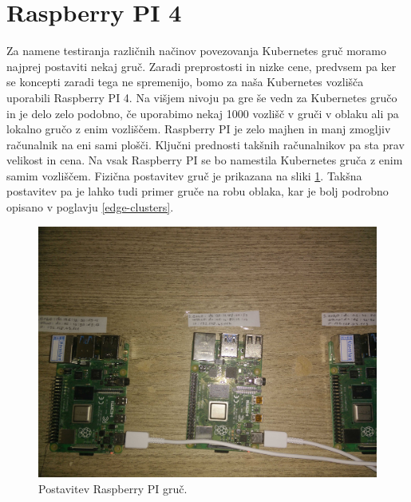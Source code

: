 \documentclass[a4paper, 12pt]{book}
\begin{document}
\section{Raspberry PI 4}
Za namene testiranja različnih načinov povezovanja Kubernetes gruč moramo najprej postaviti nekaj gruč.
Zaradi preprostosti in nizke cene, predvsem pa ker se koncepti zaradi tega ne spremenijo, bomo za naša Kubernetes vozlišča uporabili Raspberry PI 4.
Na višjem nivoju pa gre še vedn za Kubernetes gručo in je delo zelo podobno, če uporabimo nekaj 1000 vozlišč v gruči v oblaku ali pa lokalno gručo z enim vozliščem.
Raspberry PI je zelo majhen in manj zmogljiv računalnik na eni sami plošči.
Ključni prednosti takšnih računalnikov pa sta prav velikost in cena.
Na vsak Raspberry PI se bo namestila Kubernetes gruča z enim samim vozliščem.
Fizična postavitev gruč je prikazana na sliki \ref{rpi-gruce}.
Takšna postavitev pa je lahko tudi primer gruče na robu oblaka, kar je bolj podrobno opisano v poglavju \ref{edge-clusters}.
\begin{figure}[h]
\begin{center}
\includegraphics[width=1.0\textwidth]{images/postavitev-raspberry.jpg}
\end{center}
\caption{Postavitev Raspberry PI gruč.}
\label{rpi-gruce}
\end{figure}
\end{document}
